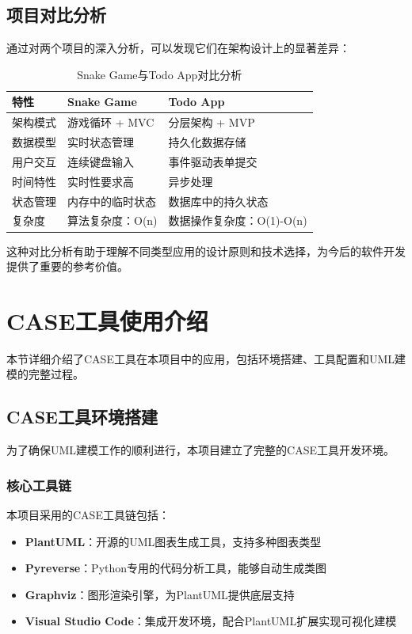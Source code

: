 \documentclass[a4paper]{article}
\begin{document}
\subsection{项目对比分析}

通过对两个项目的深入分析，可以发现它们在架构设计上的显著差异：

\begin{table}[H]
\centering
\caption{Snake Game与Todo App对比分析}
\begin{tabular}{|l|l|l|}
\hline
\textbf{特性} & \textbf{Snake Game} & \textbf{Todo App} \\
\hline
架构模式 & 游戏循环 + MVC & 分层架构 + MVP \\
\hline
数据模型 & 实时状态管理 & 持久化数据存储 \\
\hline
用户交互 & 连续键盘输入 & 事件驱动表单提交 \\
\hline
时间特性 & 实时性要求高 & 异步处理 \\
\hline
状态管理 & 内存中的临时状态 & 数据库中的持久状态 \\
\hline
复杂度 & 算法复杂度：O(n) & 数据操作复杂度：O(1)-O(n) \\
\hline
\end{tabular}
\end{table}

这种对比分析有助于理解不同类型应用的设计原则和技术选择，为今后的软件开发提供了重要的参考价值。

\section{CASE工具使用介绍}

本节详细介绍了CASE工具在本项目中的应用，包括环境搭建、工具配置和UML建模的完整过程。

\subsection{CASE工具环境搭建}

为了确保UML建模工作的顺利进行，本项目建立了完整的CASE工具开发环境。

\subsubsection{核心工具链}

本项目采用的CASE工具链包括：

\begin{itemize}
    \item \textbf{PlantUML}：开源的UML图表生成工具，支持多种图表类型
    \item \textbf{Pyreverse}：Python专用的代码分析工具，能够自动生成类图
    \item \textbf{Graphviz}：图形渲染引擎，为PlantUML提供底层支持
    \item \textbf{Visual Studio Code}：集成开发环境，配合PlantUML扩展实现可视化建模
\end{itemize}
\end{document}
